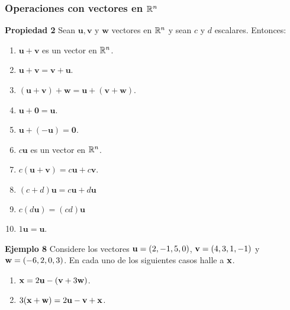 {\nologo
\begin{frame}\frametitle{Operaciones con vectores en $\mathbb{R}^n$}

\begin{prop}{\textbf{Propiedad 2}}
	Sean $\mathbf{u}, \mathbf{v}$ y $\mathbf{w}$ vectores en $\mathbb{R}^n$ y sean $c$ y $d$ escalares. Entonces:
	
	\vspace{-2mm}
	\begin{multicols}{2}		
		\begin{enumerate}			
			\justifying
			\item $\mathbf{u}+\mathbf{v}$ es un vector en $\mathbb{R}^n$. %
			\item $\mathbf{u}+\mathbf{v} = \mathbf{v}+\mathbf{u}$. %
			\item $(\mathbf{u}+\mathbf{v})+\mathbf{w} = \mathbf{u}+(\mathbf{v}+\mathbf{w})$. %
			\item $\mathbf{u}+\mathbf{0} = \mathbf{u}$.
			\item $\mathbf{u}+(-\mathbf{u}) = \mathbf{0}$.
			
			\columnbreak
			\item $c\mathbf{u}$ es un vector en $\mathbb{R}^n$. %
			\item $c(\mathbf{u}+\mathbf{v}) = c\mathbf{u} + c\mathbf{v}$. %
			\item $(c+d)\mathbf{u} = c\mathbf{u} + d\mathbf{u}$ %
			\item $c(d\mathbf{u}) = (cd)\mathbf{u}$ %
			\item $1\mathbf{u} = \mathbf{u}$.
		\end{enumerate}		
	\end{multicols}

	\vspace{-2mm}
\end{prop}

\begin{ej}{\textbf{Ejemplo 8}}\justifying
	Considere los vectores $\mathbf{u}=(2,-1,5,0)$, $\mathbf{v}=(4,3,1,-1)$ y $\mathbf{w}=(-6,2,0,3)$. 
	En cada uno de los siguientes casos halle a $\mathbf{x}$.
	
	\vspace{-2mm}
	\begin{multicols}{2}
		\begin{enumerate}
			\item[\labelname{$a$}] $\mathbf{x} = 2\mathbf{u} - (\mathbf{v}+3\mathbf{w})$.
			\item[\labelname{$b$}] $3(\mathbf{x}+\mathbf{w}) = 2\mathbf{u} - \mathbf{v} + \mathbf{x}$.
		\end{enumerate}
	\end{multicols}
	
	\vspace{-2mm}
\end{ej}

\end{frame}
}

